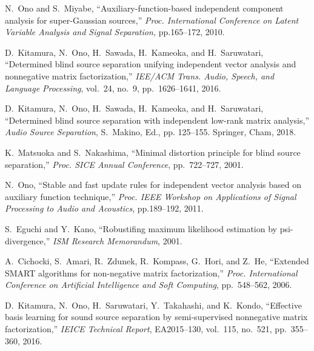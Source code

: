 \documentclass[honka]{nitkagawathesis}%
\begin{document}
\begin{thebibliography}{99}
  N.~Ono and S.~Miyabe, ``Auxiliary-function-based independent component analysis for super-Gaussian sources,'' 
  {\em Proc. International Conference on Latent Variable Analysis and Signal Separation,} pp.165--172, 2010.
    
  D.~Kitamura, N.~Ono, H.~Sawada, H.~Kameoka, and H.~Saruwatari,
  ``Determined blind source separation unifying independent vector analysis and nonnegative matrix factorization,'' 
  {\em IEE/ACM Trans. Audio, Speech, and Language Processing}, vol.~24, no.~9, pp.~1626--1641, 2016.

  D.~Kitamura, N.~Ono, H.~Sawada, H.~Kameoka, and H.~Saruwatari, ``Determined blind source separation with independent low-rank matrix analysis,'' 
  {\em Audio Source Separation}, S.~Makino, Ed., pp. 125--155. Springer, Cham, 2018.

  K.~Matsuoka and S.~Nakashima,
  ``Minimal distortion principle for blind source separation,''
  {\em Proc. SICE Annual Conference}, pp.~722--727, 2001.
  
  N.~Ono,
  ``Stable and fast update rules for independent vector analysis based on auxiliary function technique,''
  {\em Proc. IEEE Workshop on Applications of Signal Processing to Audio and Acoustics}, pp.189--192, 2011.
  
  
  S.~Eguchi and Y.~Kano, 
  ``Robustifing maximum likelihood estimation by psi- divergence,'' 
  {\em ISM Research Memorandum}, 2001.
  
  A.~Cichocki, S.~Amari, R.~Zdunek, R.~Kompass, G.~Hori, and Z.~He, 
  ``Extended SMART algorithms for non-negative matrix factorization,'' 
  {\em Proc. International Conference on Artificial Intelligence and Soft Computing}, pp.~548--562, 2006.
  
  D.~Kitamura, N.~Ono, H.~Saruwatari, Y.~Takahashi, and K.~Kondo, 
  ``Effective basis learning for sound source separation by semi-supervised nonnegative matrix factorization,'' 
  {\em IEICE Technical Report}, EA2015--130, vol.~115, no.~521, pp.~355--360, 2016.


\end{thebibliography}
\end{document}

